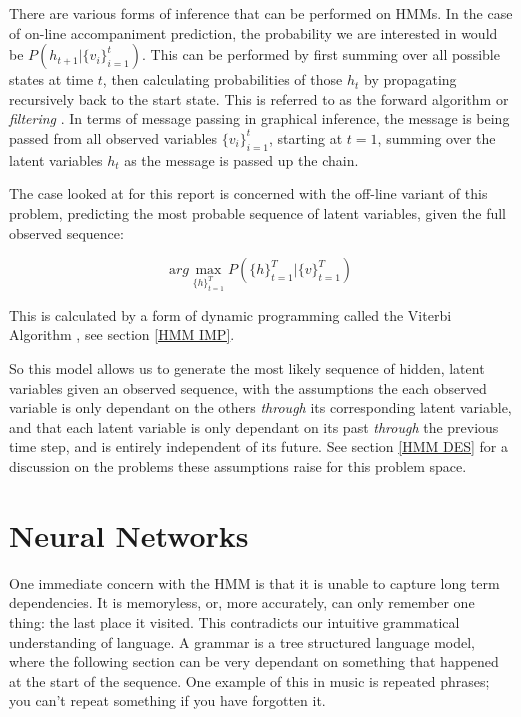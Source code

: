 \documentclass[bsc,singlespacing,logo, parskip, deptreport]{infthesis}
\begin{document}
There are various forms of inference that can be performed on HMMs. In the case of on-line accompaniment prediction, the probability we are interested in would be $P(h_{t+1} | \{v_i\}_{i=1}^{t})$. This can be performed by first summing over all possible states at time $t$, then calculating probabilities of those $h_t$ by propagating recursively back to the start state. This is referred to as the forward algorithm or {\em filtering} \cite{russell2002artificial}. In terms of message passing in graphical inference, the message is being passed from all observed variables $\{v_i\}_{i=1}^{t}$, starting at $t=1$, summing over the latent variables $h_t$ as the message is passed up the chain.

The case looked at for this report is concerned with the off-line variant of this problem, predicting the most probable sequence of latent variables, given the full observed sequence:

\begin{equation}
  {\mathrm arg}\max_{\{h\}_{t=1}^{T}} P(\{h\}_{t=1}^{T} | \{v\}_{t=1}^{T})
\end{equation}

This is calculated by a form of dynamic programming called the Viterbi Algorithm \cite{russell2002artificial}, see section \ref{HMM IMP}.

So this model allows us to generate the most likely sequence of hidden, latent variables given an observed sequence, with the assumptions the each observed variable is only dependant on the others {\em through} its corresponding latent variable, and that each latent variable is only dependant on its past {\em through} the previous time step, and is entirely independent of its future. See section \ref{HMM DES} for a discussion on the problems these assumptions raise for this problem space.

\section{Neural Networks}

One immediate concern with the HMM is that it is unable to capture long term dependencies. It is memoryless, or, more accurately, can only remember one thing: the last place it visited. This contradicts our intuitive grammatical understanding of language. A grammar is a tree structured language model, where the following section can be very dependant on something that happened at the start of the sequence. One example of this in music is repeated phrases; you can't repeat something if you have forgotten it.
\end{document}
